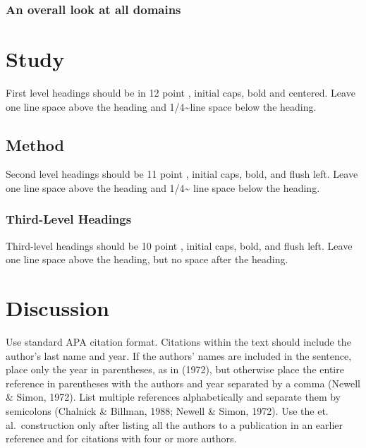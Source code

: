 \documentclass[10pt, letterpaper]{article}
\begin{document}
\hypertarget{an-overall-look-at-all-domains}{%
\subsubsection{An overall look at all
domains}\label{an-overall-look-at-all-domains}}

\hypertarget{study}{%
\section{Study}\label{study}}

First level headings should be in 12 point , initial caps, bold and
centered. Leave one line space above the heading and
1/4\textasciitilde line space below the heading.

\hypertarget{method}{%
\subsection{Method}\label{method}}

Second level headings should be 11 point , initial caps, bold, and flush
left. Leave one line space above the heading and 1/4\textasciitilde{}
line space below the heading.

\hypertarget{third-level-headings}{%
\subsubsection{Third-Level Headings}\label{third-level-headings}}

Third-level headings should be 10 point , initial caps, bold, and flush
left. Leave one line space above the heading, but no space after the
heading.

\hypertarget{discussion}{%
\section{Discussion}\label{discussion}}

Use standard APA citation format. Citations within the text should
include the author's last name and year. If the authors' names are
included in the sentence, place only the year in parentheses, as in
(1972), but otherwise place the entire reference in parentheses with the
authors and year separated by a comma (Newell \& Simon, 1972). List
multiple references alphabetically and separate them by semicolons
(Chalnick \& Billman, 1988; Newell \& Simon, 1972). Use the et.
al.~construction only after listing all the authors to a publication in
an earlier reference and for citations with four or more authors.
\end{document}
